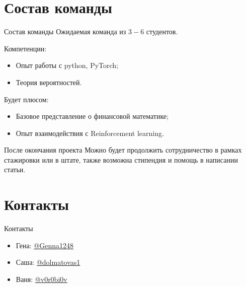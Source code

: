 \documentclass[10pt]{beamer}
\begin{document}
    \section{Состав команды}
    \begin{frame}{Состав команды}
        Ожидаемая команда из $3-6$ студентов.
        
        Компетенции:
        \begin{itemize}
            \item Опыт работы с python, PyTorch;
            \item Теория вероятностей.
        \end{itemize}

        Будет плюсом:
        \begin{itemize}
            \item Базовое представление о финансовой математике;
            \item Опыт взаимодействия с Reinforcement learning.
        \end{itemize}

        \begin{block}{После окончания проекта}
            Можно будет продолжить сотрудничество в рамках стажировки или в штате, также возможна стипендия и помощь в написании статьи.
        \end{block}
    \end{frame}

    \section{Контакты}
    \begin{frame}{Контакты}
        \begin{itemize}
            \item Гена: \href{https://t.me/Genna1248}{@Genna1248}
            \item Саша: \href{https://t.me/dolmatovas1}{@dolmatovas1}
            \item Ваня: \href{https://t.me/v0r0bi0v}{@v0r0bi0v}
        \end{itemize}
    \end{frame}
\end{document}
